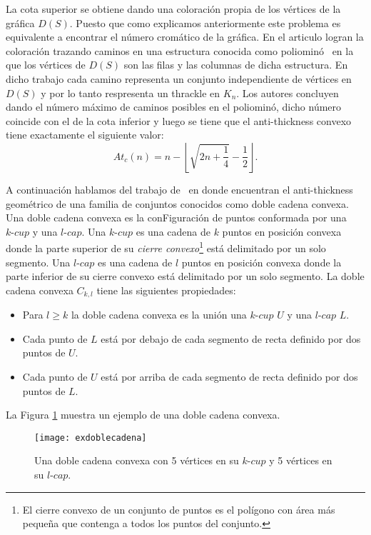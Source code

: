 La cota superior se obtiene dando una coloración propia de los vértices de la
gráfica $D(S)$. Puesto que como explicamos anteriormente este problema es
equivalente a encontrar el número cromático de la gráfica.
En el articulo logran la coloración trazando caminos en una
estructura conocida como poliominó~\cite{Fabila-Monroy2018-poly}
en la que los vértices de $D(S)$ son las filas y las columnas de dicha
estructura.
En dicho trabajo cada camino representa un conjunto independiente de vértices en
 $D(S)$ y por lo tanto respresenta un thrackle en $K_n$.
Los autores concluyen dando el número máximo de caminos posibles en el
poliominó, dicho número coincide con el de la cota inferior y luego se tiene
que el anti-thickness convexo tiene exactamente el siguiente valor:
\[ At_c(n) = n - \left\lfloor \sqrt{2n + \frac{1}{4}} - \frac{1}{2} \right\rfloor. \]

A continuación hablamos del trabajo de~\cite{Lomeli2018} en donde encuentran el
anti-thickness geométrico de una familia de conjuntos conocidos como doble
cadena convexa. Una doble cadena convexa
es la conFiguración de puntos conformada por una $k\text{-}cup$ y una
$l\text{-}cap$. Una $k\text{-}cup$ es una cadena de $k$ puntos en posición
convexa donde la parte superior de su \emph{cierre convexo}\footnote{El cierre
convexo de un conjunto de puntos es el polígono con área más pequeña que
contenga a todos los puntos del conjunto.} está delimitado por un solo
segmento. Una $l\text{-}cap$ es una cadena de $l$ puntos en posición convexa
donde la parte inferior de su cierre convexo está delimitado por un solo
segmento. La doble cadena convexa $C_{k,l}$ tiene las siguientes propiedades:
\begin{itemize}
  \item Para $l\geq k$ la doble cadena convexa es la unión una $k\text{-}cup$ $U$ y una $l\text{-}cap$ $L$.
  \item Cada punto de $L$ está por debajo de cada segmento de recta definido por dos puntos de $U$.
  \item Cada punto de $U$ está por arriba de cada segmento de recta definido por dos puntos de $L$.
\end{itemize}

La Figura \ref{fig:exdoblecadena} muestra un ejemplo de una doble cadena
convexa.
\begin{figure}[htpb]
  \centering
  \texttt{[image: exdoblecadena]}
  \caption{Una doble cadena convexa con 5 vértices en su $k\text{-}cup$ y 5 vértices en su $l\text{-}cap$.}
  \label{fig:exdoblecadena}
\end{figure}

